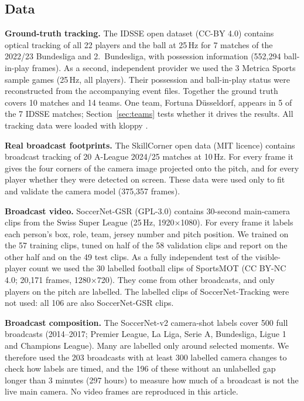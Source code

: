 \documentclass[]{interact}
\begin{document}
\subsection{Data}

\textbf{Ground-truth tracking.} The IDSSE open dataset \citep{bassek2025idsse} (CC-BY 4.0) contains optical tracking
of all 22 players and the ball at 25\,Hz for 7 matches of the 2022/23 Bundesliga and 2.~Bundesliga, with possession
information (552{,}294 ball-in-play frames). As a second, independent provider we used the 3 Metrica Sports sample
games \citep{metrica_sample} (25\,Hz, all players). Their possession and ball-in-play status were reconstructed from
the accompanying event files. Together the ground truth covers 10 matches and 14 teams. One team, Fortuna
D\"usseldorf, appears in 5 of the 7 IDSSE matches; Section~\ref{sec:teams} tests whether it drives the results. All
tracking data were loaded with kloppy \citep{kloppy}.

\textbf{Real broadcast footprints.} The SkillCorner open data \citep{skillcorner_opendata} (MIT licence) contains
broadcast tracking of 20 A-League 2024/25 matches at 10\,Hz. For every frame it gives the four corners of the camera
image projected onto the pitch, and for every player whether they were detected on screen. These data were used only
to fit and validate the camera model (375{,}357 frames).

\textbf{Broadcast video.} SoccerNet-GSR \citep{somers2024gsr} (GPL-3.0) contains 30-second main-camera clips from the
Swiss Super League (25\,Hz, 1920$\times$1080). For every frame it labels each person's box, role, team, jersey number
and pitch position. We trained on the 57 training clips, tuned on half of the 58 validation clips and report on the
other half and on the 49 test clips. As a fully independent test of the visible-player count we used the 30 labelled
football clips of SportsMOT \citep{cui2023sportsmot} (CC BY-NC 4.0; 20{,}171 frames, 1280$\times$720). They come
from other broadcasts, and only players on the pitch are labelled. The labelled clips of SoccerNet-Tracking were not
used: all 106 are also SoccerNet-GSR clips.

\textbf{Broadcast composition.} The SoccerNet-v2 camera-shot labels \citep{deliege2021soccernetv2} cover 500 full
broadcasts (2014--2017; Premier League, La Liga, Serie A, Bundesliga, Ligue 1 and Champions League). Many are labelled
only around selected moments. We therefore used the 203 broadcasts with at least 300 labelled camera changes to check
how labels are timed, and the 196 of these without an unlabelled gap longer than 3 minutes (297 hours) to measure how
much of a broadcast is not the live main camera. No video frames are reproduced in this article.
\end{document}
